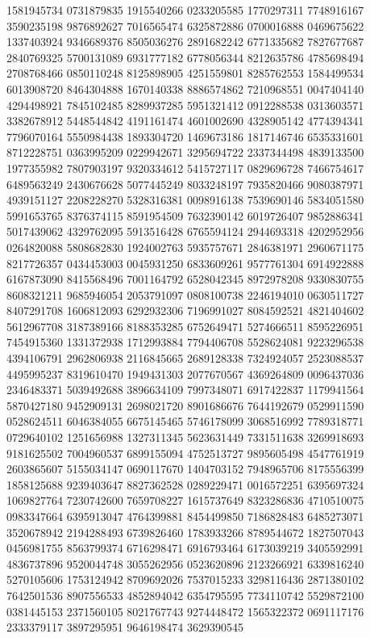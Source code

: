 {{1581945734 0731879835 1915540266 0233205585 1770297311 7748916167 3590235198
9876892627 7016565474 6325872886 0700016888 0469675622 1337403924 9346689376
8505036276 2891682242 6771335682 7827677687 2840769325 5700131089 6931777182
6778056344 8212635786 4785698494 2708768466 0850110248 8125898905 4251559801
8285762553 1584499534 6013908720 8464304888 1670140338 8886574862 7210968551
0047404140 4294498921 7845102485 8289937285 5951321412 0912288538 0313603571
3382678912 5448544842 4191161474 4601002690 4328905142 4774394341 7796070164
5550984438 1893304720 1469673186 1817146746 6535331601 8712228751 0363995209
0229942671 3295694722 2337344498 4839133500 1977355982 7807903197 9320334612
5415727117 0829696728 7466754617 6489563249 2430676628 5077445249 8033248197
7935820466 9080387971 4939151127 2208228270 5328316381 0098916138 7539690146
5834051580 5991653765 8376374115 8591954509 7632390142 6019726407 9852886341
5017439062 4329762095 5913516428 6765594124 2944693318 4202952956 0264820088
5808682830 1924002763 5935757671 2846381971 2960671175 8217726357 0434453003
0045931250 6833609261 9577761304 6914922888 6167873090 8415568496 7001164792
6528042345 8972978208 9330830755 8608321211 9685946054 2053791097 0808100738
2246194010 0630511727 8407291708 1606812093 6292932306 7196991027 8084592521
4821404602 5612967708 3187389166 8188353285 6752649471 5274666511 8595226951
7454915360 1331372938 1712993884 7794406708 5528624081 9223296538 4394106791
2962806938 2116845665 2689128338 7324924057 2523088537 4495995237 8319610470
1949431303 2077670567 4369264809 0096437036 2346483371 5039492688 3896634109
7997348071 6917422837 1179941564 5870427180 9452909131 2698021720 8901686676
7644192679 0529911590 0528624511 6046384055 6675145465 5746178099 3068516992
7789318771 0729640102 1251656988 1327311345 5623631449 7331511638 3269918693
9181625502 7004960537 6899155094 4752513727 9895605498 4547761919 2603865607
5155034147 0690117670 1404703152 7948965706 8175556399 1858125688 9239403647
8827362528 0289229471 0016572251 6395697324 1069827764 7230742600 7659708227
1615737649 8323286836 4710510075 0983347664 6395913047 4764399881 8454499850
7186828483 6485273071 3520678942 2194288493 6739826460 1783933266 8789544672
1827507043 0456981755 8563799374 6716298471 6916793464 6173039219 3405592991
4836737896 9520044748 3055262956 0523620896 2123266921 6339816240 5270105606
1753124942 8709692026 7537015233 3298116436 2871380102 7642501536 8907556533
4852894042 6354795595 7734110742 5529872100 0381445153 2371560105 8021767743
9274448472 1565322372 0691117176 2333379117 3897295951 9646198474 3629390545
}}
